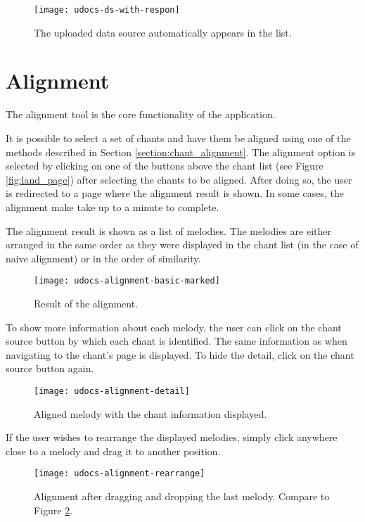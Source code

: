 \begin{figure}[!h]
\centering
\texttt{[image: udocs-ds-with-respon]}
\caption{The uploaded data source automatically appears in the list.}
\label{fig:update-ds-respon}
\end{figure}

\section{Alignment}

The alignment tool is the core functionality of the application.

It is possible to select a set of chants and have them be aligned using one of the methods described in Section \ref{section:chant_alignment}. The alignment option is selected by clicking
on one of the buttons above the chant list (see Figure \ref{fig:land_page}) after selecting the chants to be aligned. After doing so, the user is redirected to a page where the alignment result
is shown. In some cases, the alignment make take up to a minute to complete.

The alignment result is shown as a list of melodies. The melodies are either arranged in the same order as they were displayed in the chant list (in the case of
naive alignment) or in the order of similarity.

\begin{figure}[!h]
\centering
\texttt{[image: udocs-alignment-basic-marked]}
\caption{Result of the alignment.}
\label{fig:align-result}
\end{figure}

To show more information about each melody, the user can click on the chant source button by which each chant is identified. The same information as when navigating
to the chant's page is displayed. To hide the detail, click on the chant source button again.

\begin{figure}[!h]
\centering
\texttt{[image: udocs-alignment-detail]}
\caption{Aligned melody with the chant information displayed.}
\label{fig:align-detail}
\end{figure}

If the user wishes to rearrange the displayed melodies, simply click anywhere close to a melody and drag it to another position.

\begin{figure}[!h]
\centering
\texttt{[image: udocs-alignment-rearrange]}
\caption{Alignment after dragging and dropping the last melody. Compare to Figure \ref{fig:align-result}.}
\label{fig:align-rearrange}
\end{figure}

